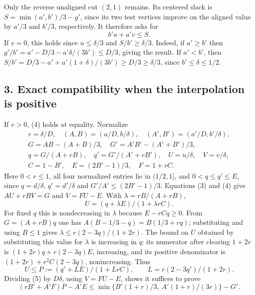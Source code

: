 \documentclass[
  10pt,
]{article}
\begin{document}
Only the reverse unaligned cut \((2,1)\) remains. Its centered slack is
\(S=\min(a',b')/3-g'\), since its two test vertices improve on the
aligned value by \(a'/3\) and \(b'/3\), respectively. It therefore asks
for \[
 b'u+a'v\le S. \tag{5}
\] If \(v=0\), this holds since \(u\le\delta/3\) and
\(S/b'\ge\delta/3\). Indeed, if \(a'\ge b'\) then
\(g'/b'=a'-D/3-a'\delta/(3b')\le D/3\), giving the result. If \(a'<b'\),
then \(S/b'=D/3-a'+a'(1+\delta)/(3b')\ge D/3\ge\delta/3\), since
\(b'\le\delta\le1/2\).

\subsection{3. Exact compatibility when the interpolation is
positive}\label{exact-compatibility-when-the-interpolation-is-positive}

If \(v>0\), (4) holds at equality. Normalize \[
\begin{gathered}
r=\delta/D,\quad (A,B)=(a/D,b/\delta),\quad(A',B')=(a'/D,b'/\delta),\\
G=AB-(A+B)/3,\quad G'=A'B'-(A'+B')/3,\\
q=G/(A+rB),\quad q'=G'/(A'+rB'),\quad U=u/\delta,\quad V=v/\delta,\\
C=1-B',\quad E=(2B'-1)/3,\quad F=1+rC.
\end{gathered}
\] Here \(0<r\le1\), all four normalized entries lie in \((1/2,1]\), and
\(0<q\le q'\le E\), since \(q=d/\delta\), \(q'=d'/\delta\) and
\(G'/A'\le(2B'-1)/3\). Equations (3) and (4) give \(A U+r B V=G\) and
\(V=FU-E\). With \(\lambda=rB/(A+rB)\), \[
 U=(q+\lambda E)/(1+\lambda rC).
\] For fixed \(q\) this is nondecreasing in \(\lambda\) because
\(E-rCq\ge0\). From \(G=(A+rB)q\) one has \(A(B-1/3-q)=B(1/3+rq)\);
substituting and using \(B\le1\) gives \(\lambda\le r(2-3q)/(1+2r)\).
The bound on \(U\) obtained by substituting this value for \(\lambda\)
is increasing in \(q\): its numerator after clearing \(1+2r\) is
\((1+2r)q+r(2-3q)E\), increasing, and its positive denominator is
\((1+2r)+r^2 C(2-3q)\), nonincreasing. Thus \[
 U\le P:=(q'+L E)/(1+LrC),\qquad L=r(2-3q')/(1+2r).
\] Dividing (5) by \(D\delta\), using \(V=FU-E\), shows it suffices to
prove \[
 (rB'+A'F)P-A'E\le\min\{B'(1+r)/3,\ A'(1+r)/(3r)\}-G'. \tag{6}
\]
\end{document}
